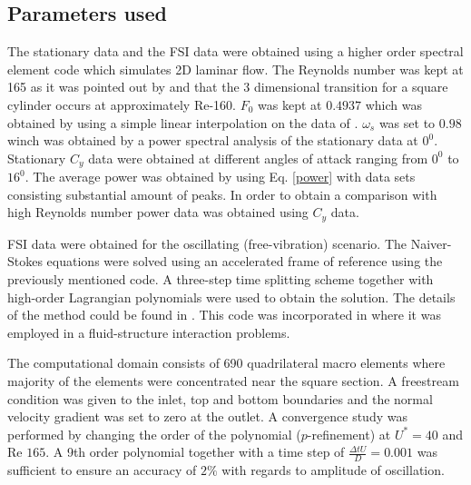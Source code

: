 \subsection{Parameters used} 
 
The stationary data and the FSI data were obtained using a higher order spectral element code which simulates 2D laminar flow. The Reynolds number was kept at 165 as it was pointed out by \cite{Sheard2009} and \cite{Tong2008} that the 3 dimensional transition for a square cylinder occurs at approximately Re-160. $F_0$ was kept at $0.4937$ which was obtained by using a simple linear interpolation on the data of \cite{Joly2012}. $\omega_s$ was set to $0.98$ winch was obtained by a power spectral analysis of the stationary data at $0^0$. Stationary $C_y$ data were obtained at different angles of attack ranging from $0^0$ to $16^0$. The average power was obtained by using Eq. \eqref{power} with data sets consisting substantial amount of peaks. In order to obtain a comparison with high Reynolds number power data was obtained using \cite{Parkinson1964} $C_y$ data.


 FSI data were obtained for the oscillating (free-vibration) scenario. The Naiver-Stokes equations were solved using an accelerated frame of reference using the previously mentioned code. A three-step time splitting scheme together with high-order Lagrangian polynomials were used to obtain the solution. The details of the method could be found in \cite{Thompson2006,Thompson1996a}. This code was incorporated in \cite{Leontini2011,Leontini2007a}  where it was employed in a fluid-structure interaction problems. 
 
 The computational domain consists of 690 quadrilateral macro elements where majority of the elements were concentrated near the square section. A freestream condition was given to the inlet, top and bottom boundaries and the normal velocity gradient was set to zero at the outlet. A convergence study was performed by changing the order of the polynomial ($p$-refinement) at $U^*=40$ and Re $165$. A 9th order polynomial together with a time step of $\frac{\Delta tU}{D}=0.001$ was sufficient to ensure an accuracy of $2\%$ with regards to amplitude of oscillation.  
 

 
 
 

 
 
 
 









